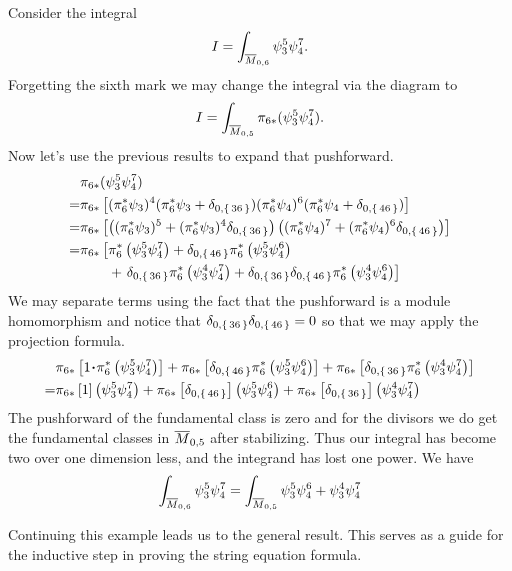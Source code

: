 \documentclass[12pt]{memoir}
\begin{document}
\begin{Ex}
    Consider the integral 
    $$I=\int_{\overline M_{0,6}}\psi_3^5\psi_4^7.$$
    Forgetting the sixth mark we may change the integral via the diagram to
    $$I=\int_{\overline M_{0,5}}\pi_{6\ast}(\psi_3^5\psi_4^7).$$
    Now let's use the previous results to expand that pushforward. 
    \begin{align*}
        &\pi_{6\ast}(\psi_3^5\psi_4^7)\\
        =&\pi_{6\ast}\bonj{(\pi_6^\ast\psi_3)^{4}(\pi_6^\ast\psi_3+\dl_{0,\set{36}})(\pi_6^\ast\psi_4)^{6}(\pi_6^\ast\psi_4+\dl_{0,\set{46}})}\\
        =&\pi_{6\ast}\bonj{\left((\pi_6^\ast\psi_3)^{5}+(\pi_6^\ast\psi_3)^{4}\dl_{0,\set{36}}\right)\left((\pi_6^\ast\psi_4)^{7}+(\pi_6^\ast\psi_4)^{6}\dl_{0,\set{46}}\right)}\\
        =&\pi_{6\ast}\left\lbrack\pi_6^\ast\left(\psi_3^5\psi_4^7\right)+\dl_{0,\set{46}}\pi_6^\ast\left(\psi_3^5\psi_4^6\right)\right.\\
        &\phantom{\pi_{6\ast}\left\lbrack\right.}+\left.\dl_{0,\set{36}}\pi_6^\ast\left(\psi_3^4\psi_4^7\right)+\dl_{0,\set{36}}\dl_{0,\set{46}}\pi_6^\ast\left(\psi_3^4\psi_4^6\right)\right\rbrack
    \end{align*}
    We may separate terms using the fact that the pushforward is a module homomorphism and notice that $\delta_{0,\{\,36\,\}}\delta_{0,\{\,46\,\}}=0$ so that we may apply the projection formula.
    \begin{align*}
        &\pi_{6\ast}\left\lbrack1\.\pi_6^\ast\left(\psi_3^5\psi_4^7\right)\right\rbrack+\pi_{6\ast}\bonj{\dl_{0,\set{46}}\pi_6^\ast\left(\psi_3^5\psi_4^6\right)}+\pi_{6\ast}\bonj{\dl_{0,\set{36}}\pi_6^\ast\left(\psi_3^4\psi_4^7\right)}\\
        =&\pi_{6\ast}\bonj{1}\left(\psi_3^5\psi_4^7\right)+\pi_{6\ast}\bonj{\dl_{0,\set{46}}}\left(\psi_3^5\psi_4^6\right)+\pi_{6\ast}\bonj{\dl_{0,\set{36}}}\left(\psi_3^4\psi_4^7\right)
    \end{align*}
    The pushforward of the fundamental class is zero and for the divisors we do get the fundamental classes in $\overline{M}_{0,5}$ after stabilizing. Thus our integral has become two over one dimension less, and the integrand has lost one power. We have
    $$\int_{\overline M_{0,6}}\psi_3^5\psi_4^7=\int_{\overline{M}_{0,5}}\psi_3^5\psi_4^6+\psi_3^4\psi_4^7$$
\end{Ex}

Continuing this example leads us to the general result. This serves as a guide for the inductive step in proving the string equation formula.
\end{document}
